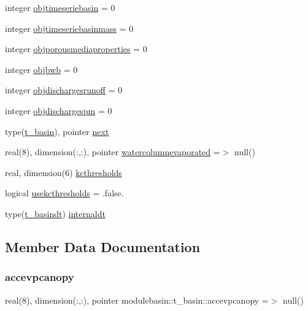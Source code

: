 \begin{DoxyCompactItemize}
\item 
integer \mbox{\hyperlink{structmodulebasin_1_1t__basin_aa264c640c036502e73852c5e9dd8f573}{objtimeseriebasin}} = 0
\item 
integer \mbox{\hyperlink{structmodulebasin_1_1t__basin_acd8442930d5a25f8fa2a25bef83be8ea}{objtimeseriebasinmass}} = 0
\item 
integer \mbox{\hyperlink{structmodulebasin_1_1t__basin_a62b6d9c3c191bd4e37bd026ceb5da9bc}{objporousmediaproperties}} = 0
\item 
integer \mbox{\hyperlink{structmodulebasin_1_1t__basin_a76f82b0383a5193b00c6cfdce80f9198}{objbwb}} = 0
\item 
integer \mbox{\hyperlink{structmodulebasin_1_1t__basin_a98d06bb88ebe8ed000e27bfc5fd02dad}{objdischargesrunoff}} = 0
\item 
integer \mbox{\hyperlink{structmodulebasin_1_1t__basin_af1388723a9e5aa688b1cb21c35a9a716}{objdischargespm}} = 0
\item 
type(\mbox{\hyperlink{structmodulebasin_1_1t__basin}{t\+\_\+basin}}), pointer \mbox{\hyperlink{structmodulebasin_1_1t__basin_a7da65ee8d068457f0d11b3b6752370b5}{next}}
\item 
real(8), dimension(\+:,\+:), pointer \mbox{\hyperlink{structmodulebasin_1_1t__basin_aaec01f589619b82a5fda03074f4d6914}{watercolumnevaporated}} =$>$ null()
\item 
real, dimension(6) \mbox{\hyperlink{structmodulebasin_1_1t__basin_a68d1bbe6fce9bfc054ba35df6093eb67}{kcthresholds}}
\item 
logical \mbox{\hyperlink{structmodulebasin_1_1t__basin_aa2c3c6758ef8584e284358c7b200c7ab}{usekcthresholds}} = .false.
\item 
type(\mbox{\hyperlink{structmodulebasin_1_1t__basindt}{t\+\_\+basindt}}) \mbox{\hyperlink{structmodulebasin_1_1t__basin_a582e23b07c5c624526e4d68841ed2378}{internaldt}}
\end{DoxyCompactItemize}


\subsection{Member Data Documentation}
\mbox{\label{structmodulebasin_1_1t__basin_a882101757e31b97c7175ac79be4c1e87}} 
\subsubsection{\texorpdfstring{accevpcanopy}{accevpcanopy}}
{\footnotesize\ttfamily real(8), dimension(\+:,\+:), pointer modulebasin\+::t\+\_\+basin\+::accevpcanopy =$>$ null()\hspace{0.3cm}{\ttfamily [private]}}

